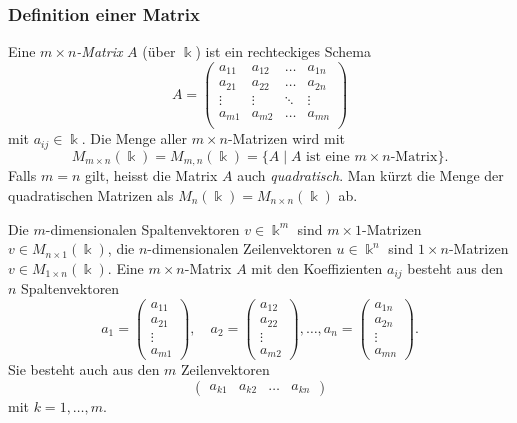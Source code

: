 \subsubsection{Definition einer Matrix}
\begin{definition}
Eine {\em $m\times n$-Matrix} $A$ (über $\Bbbk$) ist ein rechteckiges Schema
%
\[
A
=
\begin{pmatrix}
a_{11}&a_{12}&\dots &a_{1n}\\
a_{21}&a_{22}&\dots &a_{2n}\\
\vdots&\vdots&\ddots&\vdots\\
a_{m1}&a_{m2}&\dots &a_{mn}\\
\end{pmatrix}
\]
mit $a_{i\!j}\in\Bbbk$.
Die Menge aller $m\times n$-Matrizen wird mit
\[
M_{m\times n}(\Bbbk)
=
M_{m,n}(\Bbbk)
=
\{ A \mid \text{$A$ ist eine $m\times n$-Matrix}\}.
\]
Falls $m=n$ gilt, heisst die Matrix $A$ auch {\em quadratisch}.
%
Man kürzt die Menge der quadratischen Matrizen als
$M_n(\Bbbk) = M_{n\times n}(\Bbbk)$ ab.
\end{definition}

Die $m$-dimensionalen Spaltenvektoren $v\in \Bbbk^m$ sind $m\times 1$-Matrizen
$v\in M_{n\times 1}(\Bbbk)$, die $n$-dimensio\-nalen Zeilenvektoren
$u\in\Bbbk^n$ sind $1\times n$-Matrizen $v\in M_{1\times n}(\Bbbk)$.
Eine $m\times n$-Matrix $A$ mit den Koeffizienten $a_{i\!j}$ besteht aus
den $n$ Spaltenvektoren
\[
a_1 = \begin{pmatrix} a_{11} \\ a_{21} \\ \vdots \\ a_{m1} \end{pmatrix},\quad
a_2 = \begin{pmatrix} a_{12} \\ a_{22} \\ \vdots \\ a_{m2} \end{pmatrix},\dots,
a_n = \begin{pmatrix} a_{1n} \\ a_{2n} \\ \vdots \\ a_{mn} \end{pmatrix}.
\]
Sie besteht auch aus den $m$ Zeilenvektoren
\[
\begin{pmatrix} a_{k1} & a_{k2} & \dots & a_{kn} \end{pmatrix}
\]
mit $k=1,\dots,m$.

